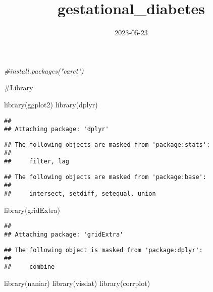 \documentclass[
]{article}
\title{gestational\_diabetes}
\author{}
\date{\vspace{-2.5em}2023-05-23}
\newenvironment{Shaded}{\begin{snugshade}}{\end{snugshade}}
\newcommand{\CommentTok}[1]{\textcolor[rgb]{0.56,0.35,0.01}{\textit{#1}}}
\newcommand{\FunctionTok}[1]{\textcolor[rgb]{0.00,0.00,0.00}{#1}}
\newcommand{\NormalTok}[1]{#1}
\begin{document}
\maketitle

\begin{Shaded}
\begin{Highlighting}[]
\CommentTok{\#install.packages("caret")}
\end{Highlighting}
\end{Shaded}

\#Library

\begin{Shaded}
\begin{Highlighting}[]
\FunctionTok{library}\NormalTok{(ggplot2)}
\FunctionTok{library}\NormalTok{(dplyr)}
\end{Highlighting}
\end{Shaded}

\begin{verbatim}
## 
## Attaching package: 'dplyr'
\end{verbatim}

\begin{verbatim}
## The following objects are masked from 'package:stats':
## 
##     filter, lag
\end{verbatim}

\begin{verbatim}
## The following objects are masked from 'package:base':
## 
##     intersect, setdiff, setequal, union
\end{verbatim}

\begin{Shaded}
\begin{Highlighting}[]
\FunctionTok{library}\NormalTok{(gridExtra)}
\end{Highlighting}
\end{Shaded}

\begin{verbatim}
## 
## Attaching package: 'gridExtra'
\end{verbatim}

\begin{verbatim}
## The following object is masked from 'package:dplyr':
## 
##     combine
\end{verbatim}

\begin{Shaded}
\begin{Highlighting}[]
\FunctionTok{library}\NormalTok{(naniar)}
\FunctionTok{library}\NormalTok{(visdat)}
\FunctionTok{library}\NormalTok{(corrplot)}
\end{Highlighting}
\end{Shaded}
\end{document}
